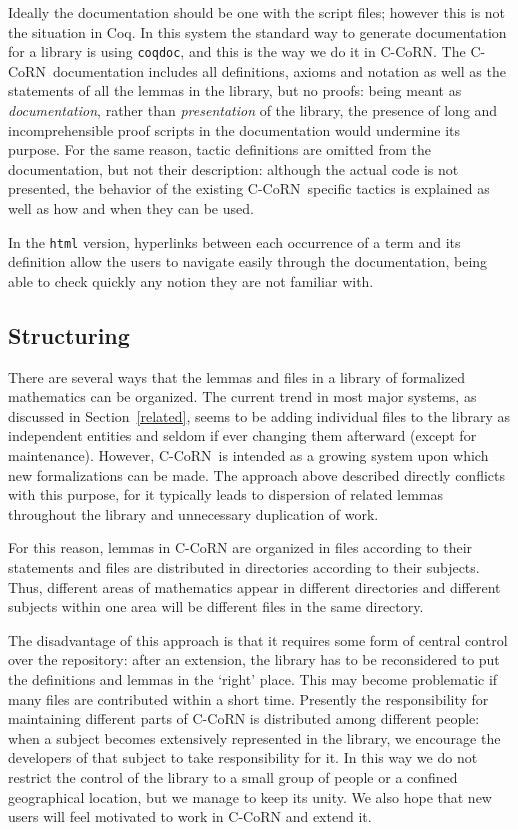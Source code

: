 \documentclass[runningheads]{llncs}
\newcommand{\ccorn}{\mbox{C-CoRN}}
\newcommand{\coq}{Coq}
\newcommand{\coqdoc}{\texttt{coqdoc}}
\begin{document}
Ideally the documentation should be one with the script files; however
this is not the situation in \coq.  In this system the standard way to
generate documentation for a library is using \coqdoc, and this is the
way we do it in \ccorn.
The \ccorn\ documentation includes all definitions, axioms and
notation as well as the statements of all the lemmas in the library,
but no proofs: being meant as \emph{documentation}, rather than
\emph{presentation} of the library, the presence of long
and incomprehensible proof scripts in the documentation would
undermine its purpose.
For the same reason, tactic definitions are omitted from the documentation,
but not their description: although the actual code is not presented, the
behavior of the existing \ccorn\ specific tactics is explained as well as how
and when they can be used.

In the \texttt{html} version, hyperlinks between each occurrence of a term and
its definition allow the users to navigate easily through the documentation,
being able to check quickly any notion they are not familiar with.

\subsection*{Structuring}

There are several ways that the lemmas and files in a library of
formalized mathematics can be organized.  The current trend in most
major systems, as discussed in Section~\ref{related}, seems to be
adding individual files to the library as independent entities and
seldom if ever changing them afterward (except for maintenance).
However, \ccorn\ is intended as a growing system upon which new
formalizations can be made.
The approach above described directly conflicts with this purpose, for it
typically leads to dispersion of related lemmas throughout the library and
unnecessary duplication of work.

For this reason, lemmas in {\ccorn} are organized in files according
to their statements and files are distributed in directories
according to their subjects.
Thus, different areas of mathematics appear in different directories and
different subjects within one area will be different files in the same
directory. 

The disadvantage of this approach is that it requires some form of central
control over the repository:\label{contradictions} after an
extension, the library has to be reconsidered to put the definitions
and lemmas in the `right' place. This may become problematic if many
files are contributed within a short time.
Presently the responsibility for maintaining different parts of {\ccorn}
is distributed among different people: when a subject becomes extensively
represented in the library, we encourage the developers of that subject to
take responsibility for it.
In this way we do not restrict the control of the library to a small group
of people or a confined geographical location, but we manage to keep its
unity.
We also hope that new users will feel motivated to work in {\ccorn} and
extend it.
\end{document}
